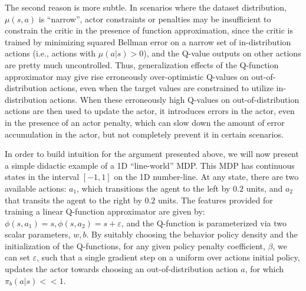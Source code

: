 The second reason is more subtle. In scenarios where the dataset distribution, $\mu(s, a)$ is ``narrow'',
actor constraints or penalties may be insufficient to constrain the critic in the presence of function approximation, since the critic is trained by minimizing squared Bellman error on a narrow set of in-distribution actions (i.e., actions with $\mu(a|s) > 0$), and the Q-value outputs on other actions are pretty much uncontrolled.
Thus, generalization effects of the Q-function approximator may give rise erroneously over-optimistic Q-values on out-of-distribution actions, even when the target values are constrained to utilize in-distribution actions. When these erroneously high Q-values on out-of-distribution actions are then used to update the actor, it introduces errors in the actor, even in the presence of an actor penalty, which can slow down the amount of error accumulation in the actor, but not completely prevent it in certain scenarios.

In order to build intuition for the argument presented above, we will now present a simple didactic example of a 1D ``line-world'' MDP. This MDP has continuous states in the interval $[-1, 1]$ on the 1D number-line. At any state, there are two available actions: $a_1$, which transitions the agent to the left by $0.2$ units, and $a_2$ that transits the agent to the right by $0.2$ units.
The features provided for training a linear Q-function approximator are given by: $\phi(s, a_1) = s, \phi(s, a_2) = s + \varepsilon$, and the Q-function is parameterized via two scalar parameters, $w, b$. By suitably choosing the behavior policy density and the initialization of the Q-functions, for any given policy penalty coefficient, $\beta$,
we can set $\varepsilon$, such that a single gradient step on a uniform over actions initial policy, updates the actor towards choosing an out-of-distribution action $a$, for which $\pi_b(a|s) << 1$. 

